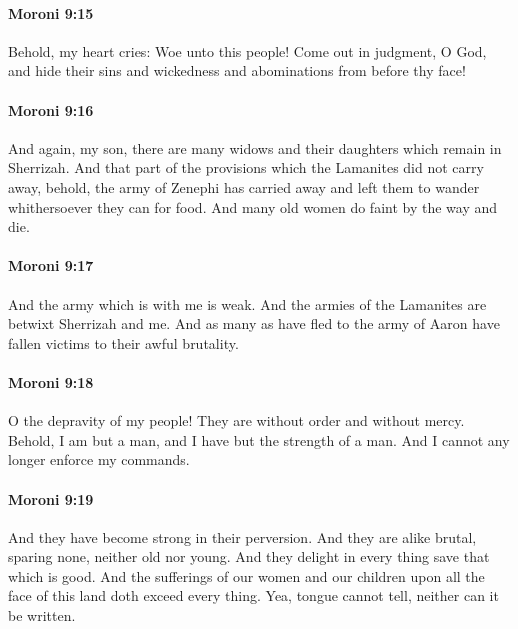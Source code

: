 		\paragraph{Moroni 9:15} %
			\label{MORONI-9-15}

			Behold, my heart cries:
			Woe unto this people!
			Come out in judgment, O God,
			and hide their sins and wickedness and abominations
			from before thy face!

		\paragraph{Moroni 9:16} %
			\label{MORONI-9-16}

			And again, my son,
			there are many widows and their daughters which remain in Sherrizah.
			And that part of the provisions which the Lamanites did not carry away,
			behold, the army of Zenephi has carried away
			and left them to wander whithersoever they can for food.
			And many old women do faint by the way and die.

		\paragraph{Moroni 9:17} %
			\label{MORONI-9-17}

			And the army which is with me is weak.
			And the armies of the Lamanites are betwixt Sherrizah and me.
			And as many as have fled to the army of Aaron
			have fallen victims to their awful brutality.

		\paragraph{Moroni 9:18} %
			\label{MORONI-9-18}

			O the depravity of my people!
			They are without order and without mercy.
			Behold, I am but a man, and I have but the strength of a man.
			And I cannot any longer enforce my commands.

		\paragraph{Moroni 9:19} %
			\label{MORONI-9-19}

			And they have become strong in their perversion.
			And they are alike brutal,
			sparing none, neither old nor young.
			And they delight in every thing save that which is good.
			And the sufferings of our women and our children
			upon all the face of this land
			doth exceed every thing.
			Yea, tongue cannot tell,
			neither can it be written.

